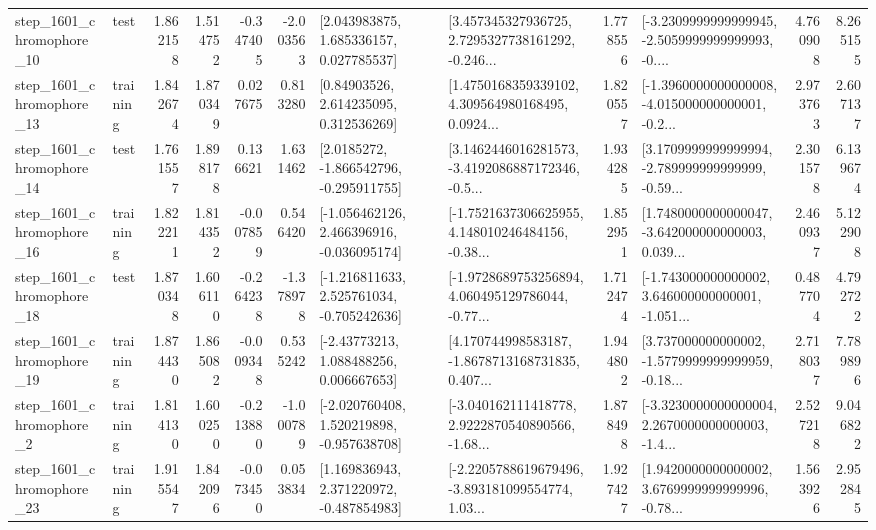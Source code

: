 \begin{tabular}{llrrrrllrlrr}
 step\_1601\_chromophore\_10 &      test &      1.862158 &    1.514752 &     -0.347405 & -2.003563 &     [2.043983875, 1.685336157, 0.027785537] &  [3.457345327936725, 2.7295327738161292, -0.246... &       1.778556 &  [-3.2309999999999945, -2.5059999999999993, -0.... &            4.760908 &          8.265155 \\
 step\_1601\_chromophore\_13 &  training &      1.842674 &    1.870349 &      0.027675 &  0.813280 &      [0.84903526, 2.614235095, 0.312536269] &  [1.4750168359339102, 4.309564980168495, 0.0924... &       1.820557 &  [-1.3960000000000008, -4.015000000000001, -0.2... &            2.973763 &          2.607137 \\
 step\_1601\_chromophore\_14 &      test &      1.761557 &    1.898178 &      0.136621 &  1.631462 &     [2.0185272, -1.866542796, -0.295911755] &  [3.1462446016281573, -3.4192086887172346, -0.5... &       1.934285 &  [3.1709999999999994, -2.789999999999999, -0.59... &            2.301578 &          6.139674 \\
 step\_1601\_chromophore\_16 &  training &      1.822211 &    1.814352 &     -0.007859 &  0.546420 &   [-1.056462126, 2.466396916, -0.036095174] &  [-1.7521637306625955, 4.148010246484156, -0.38... &       1.852951 &  [1.7480000000000047, -3.642000000000003, 0.039... &            2.460937 &          5.122908 \\
 step\_1601\_chromophore\_18 &      test &      1.870348 &    1.606110 &     -0.264238 & -1.378978 &   [-1.216811633, 2.525761034, -0.705242636] &  [-1.9728689753256894, 4.060495129786044, -0.77... &       1.712474 &  [-1.743000000000002, 3.646000000000001, -1.051... &            0.487704 &          4.792722 \\
 step\_1601\_chromophore\_19 &  training &      1.874430 &    1.865082 &     -0.009348 &  0.535242 &     [-2.43773213, 1.088488256, 0.006667653] &  [4.170744998583187, -1.8678713168731835, 0.407... &       1.944802 &  [3.737000000000002, -1.5779999999999959, -0.18... &            2.718037 &          7.789896 \\
  step\_1601\_chromophore\_2 &  training &      1.814130 &    1.600250 &     -0.213880 & -1.000789 &   [-2.020760408, 1.520219898, -0.957638708] &  [-3.040162111418778, 2.9222870540890566, -1.68... &       1.878498 &  [-3.3230000000000004, 2.2670000000000003, -1.4... &            2.527218 &          9.046822 \\
 step\_1601\_chromophore\_23 &  training &      1.915547 &    1.842096 &     -0.073450 &  0.053834 &    [1.169836943, 2.371220972, -0.487854983] &  [-2.2205788619679496, -3.893181099554774, 1.03... &       1.927427 &  [1.9420000000000002, 3.6769999999999996, -0.78... &            1.563926 &          2.952845 \\

\end{tabular}
